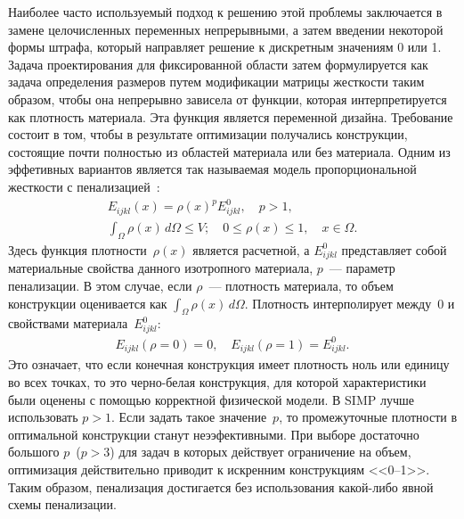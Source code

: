 Наиболее часто используемый подход к решению этой проблемы заключается в замене целочисленных переменных непрерывными, а затем введении некоторой формы штрафа, который направляет решение к дискретным значениям 0 или 1. Задача проектирования для фиксированной области затем формулируется как задача определения размеров путем модификации матрицы жесткости таким образом, чтобы она непрерывно зависела от функции, которая интерпретируется как плотность материала. Эта функция является переменной дизайна. Требование состоит в том, чтобы в результате оптимизации получались конструкции, состоящие почти полностью из областей материала или без материала.  
Одним из эффетивных вариантов является так называемая модель пропорциональной жесткости с пенализацией~\cite{Bendsoe2003}: 
\begin{equation}\label{eq:simp2} 
	\begin{aligned}
	E_{ijkl}(x) = \rho(x)^p E^0_{ijkl}, \quad p > 1,\\
	\int_{\Omega} \rho(x) \, d\Omega \leq V; \quad 0 \leq \rho(x) \leq 1, \quad x \in \Omega.
	\end{aligned} 
\end{equation}
Здесь функция плотности~$\rho(x)$ является расчетной, а $E_{ijkl}^0$ представляет собой материальные свойства данного изотропного материала, $p$~--- параметр пенализации. В этом случае, если $\rho$~--- плотность материала, то объем конструкции оценивается как $\int_{\Omega} \rho(x) \, d\Omega$.  Плотность интерполирует между~0 и свойствами материала~$E^0_{ijkl}$: 
\begin{equation}\label{eq:simp3} 
 	\begin{aligned}
 		E_{ijkl}(\rho=0) = 0, \quad E_{ijkl}(\rho=1) = E^0_{ijkl}.
 	\end{aligned} 
\end{equation}
Это означает, что если конечная конструкция имеет плотность ноль или единицу во всех точках, то это черно-белая конструкция, для которой характеристики были оценены с помощью корректной физической модели. 
В SIMP лучше использовать $p > 1$. Если задать такое значение~$p$, то промежуточные плотности в оптимальной конструкции станут неээфективными. 
При выборе достаточно большого $p$~($p > 3$) для задач в которых действует ограничение на объем, оптимизация действительно приводит к искренним конструкциям <<0--1>>.
Таким образом, пенализация достигается без использования какой-либо явной схемы пенализации. 

